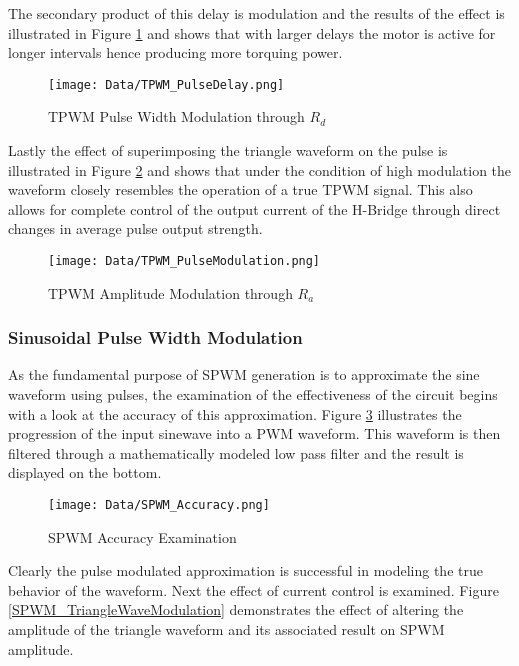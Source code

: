 \documentclass[12pt]{article}
\begin{document}
The secondary product of this delay is modulation and the results of the effect is illustrated in Figure \ref{PhaseDelayMod} and shows that with larger delays the motor is active for longer intervals hence producing more torquing power.

\begin{figure}[H]
\centering
\caption{TPWM Pulse Width Modulation through $R_d$}
\texttt{[image: Data/TPWM\_PulseDelay.png]}
\label{PhaseDelayMod}
\end{figure}

Lastly the effect of superimposing the triangle waveform on the pulse is illustrated in Figure \ref{TPWMA} and shows that under the condition of high modulation the waveform closely resembles the operation of a true TPWM signal. This also allows for complete control of the output current of the H-Bridge through direct changes in average pulse output strength.

\begin{figure}[H]
\centering
\caption{TPWM Amplitude Modulation through $R_a$}
\texttt{[image: Data/TPWM\_PulseModulation.png]}
\label{TPWMA}
\end{figure}

\subsubsection{Sinusoidal Pulse Width Modulation}%

As the fundamental purpose of SPWM generation is to approximate the sine waveform using pulses, the examination of the effectiveness of the circuit begins with a look at the accuracy of this approximation. Figure \ref{SPWM_Accuracy} illustrates the progression of the input sinewave into a PWM waveform. This waveform is then filtered through a mathematically modeled low pass filter and the result is displayed on the bottom.

\begin{figure}[H]
\centering
\caption{SPWM Accuracy Examination}
\texttt{[image: Data/SPWM\_Accuracy.png]}
\label{SPWM_Accuracy}
\end{figure}

Clearly the pulse modulated approximation is successful in modeling the true behavior of the waveform. Next the effect of current control is examined. Figure \ref{SPWM_TriangleWaveModulation} demonstrates the effect of altering the amplitude of the triangle waveform and its associated result on SPWM amplitude.
\end{document}
